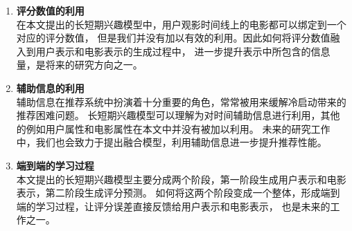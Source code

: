 \begin{enumerate}
\item \textbf{评分数值的利用}\\
在本文提出的长短期兴趣模型中，用户观影时间线上的电影都可以绑定到一个对应的评分数值，
但是我们并没有加以有效的利用。因此如何将评分数值融入到用户表示和电影表示的生成过程中，
进一步提升表示中所包含的信息量，是将来的研究方向之一。

\item \textbf{辅助信息的利用}\\
辅助信息在推荐系统中扮演着十分重要的角色，常常被用来缓解冷启动带来的推荐困难问题。
长短期兴趣模型可以理解为对时间辅助信息进行利用，其他的例如用户属性和电影属性在本文中并没有被加以利用。
未来的研究工作中，我们也会致力于提出融合模型，利用辅助信息进一步提升推荐性能。

\item \textbf{端到端的学习过程}\\
本文提出的长短期兴趣模型主要分成两个阶段，第一阶段生成用户表示和电影表示，第二阶段生成评分预测。
如何将这两个阶段变成一个整体，形成端到端的学习过程，让评分误差直接反馈给用户表示和电影表示，
也是未来的工作之一。

\end{enumerate}


